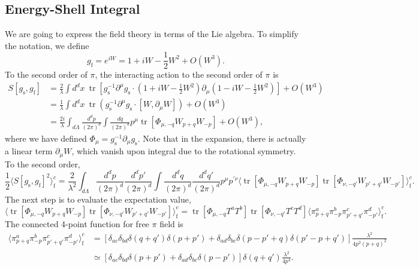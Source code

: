 \documentclass[aps,prb,superscriptaddress,nofootinbib]{revtex4}
\def \tr{\operatorname{tr}}
\begin{document}
\subsection{Energy-Shell Integral}
We are going to express the field theory in terms of the Lie algebra.
To simplify the notation, we define 
\begin{equation}
	g_{\mathrm{f}} = e^{iW} = 1 + i W - \frac{1}{2}W^2 + O(W^3).
\end{equation}
To the second order of $\pi$, the interacting action to the second order of $\pi$ is
\begin{equation}
\begin{aligned}
	S[g_{\mathrm{s}},g_{\mathrm{f}}] 
	&= \frac{2}{\lambda} \int d^d x\ \tr\left[g_{\mathrm{s}}^{-1}\partial^\mu g_{\mathrm{s}} \cdot \left(1+iW-\frac{1}{2}W^2\right) \partial_\mu \left(1-iW-\frac{1}{2}W^2\right)\right] +O(W^3)\\
	&= \frac{1}{\lambda} \int d^d x\ \tr\left(g_{\mathrm{s}}^{-1}\partial^\mu g_{\mathrm{s}} \cdot [W,\partial_\mu W]\right)+O(W^3) \\
	&= \frac{2i}{\lambda}\int_{d\Lambda} \frac{d^d p}{(2\pi)^d}\int\frac{dq}{(2\pi)^d} p^\mu \tr\left[\Phi_{\mu,-q}W_{p+q}W_{-p}\right]+O(W^3),
\end{aligned}
\end{equation}
where we have defined $\Phi_\mu = g_{\mathrm{s}}^{-1}\partial_\mu g_{\mathrm{s}}$.
Note that in the expansion, there is actually a linear term $\partial_\mu W$, which vanish upon integral due to the rotational symmetry.
To the second order,
\begin{equation}
	\frac{1}{2}\langle S[g_{\mathrm{s}},g_{\mathrm{f}}]^2\rangle_{\mathrm{f}}^c
	= \frac{2}{\lambda^2} \int_{d\Lambda}\frac{d^d p}{(2\pi)^d} \frac{d^d p'}{(2\pi)^d}\int\frac{d^d q}{(2\pi)^d}\frac{d^d q'}{(2\pi)^d} p^\mu p^{\prime\nu} 
	\langle \tr\left[\Phi_{\mu,-q}W_{p+q}W_{-p}\right]\tr\left[\Phi_{\nu,-q'}W_{p'+q'}W_{-p'}\right]\rangle^c_{\mathrm{f}}.
\end{equation}
The next step is to evaluate the expectation value,
\begin{equation}
	\langle \tr\left[\Phi_{\mu,-q}W_{p+q}W_{-p}\right]\tr\left[\Phi_{\nu,-q'}W_{p'+q'}W_{-p'}\right]\rangle^c_{\mathrm{f}}
	=  \tr\left[\Phi_{\mu,-q}T^aT^b\right]\tr\left[\Phi_{\nu,-q'}T^c T^d\right]\langle\pi^a_{p+q}\pi^b_{-p}\pi^c_{p'+q'}\pi^d_{-p'}\rangle^c_{\mathrm{f}}.
\end{equation}
The connected 4-point function for free $\pi$ field is
\begin{equation}
\begin{aligned}
	\langle\pi^a_{p+q}\pi^b_{-p}\pi^c_{p'+q'}\pi^d_{-p'}\rangle^c_{\mathrm{f}}
	&= \left[\delta_{ac}\delta_{bd}\delta(q+q')\delta(p+p') + \delta_{ad}\delta_{bc}\delta(p-p'+q)\delta(p'-p+q')\right]\frac{\lambda^2}{4p^2(p+q)^2} \\
	&\simeq [\delta_{ac}\delta_{bd}\delta(p+p')+\delta_{ad}\delta_{bc}\delta(p-p')]\delta(q+q')\frac{\lambda^2}{4p^4}.
\end{aligned}
\end{equation}
\end{document}

